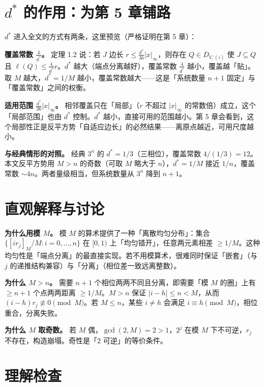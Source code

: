 \documentclass[a4paper,11pt,openany]{ctexbook}
\numberwithin{equation}{chapter}
\numberwithin{figure}{chapter}
\numberwithin{table}{chapter}
\begin{document}
\section{$d^*$ 的作用：为第 5 章铺路}

$d^*$ 进入全文的方式有两条，这里预览（严格证明在第 5 章）：

\textbf{覆盖常数 $\frac4{d^*}$。} 定理 1.2 说：若 $J$ 边长 $r\le\frac{d^*}{36}|x|_\infty$，则存在 $Q\in D_{V,(i)}$ 使 $J\subseteq Q$ 且 $\ell(Q)\le\frac4{d^*}r$。$d^*$ 越大（端点分离越好），覆盖常数 $\frac4{d^*}$ 越小，覆盖越「贴」。取 $M$ 越大，$d^*=1/M$ 越小，覆盖常数越大——这是「系统数量 $n+1$ 固定」与「覆盖常数」之间的权衡。

\textbf{适用范围 $\frac{d^*}{36}|x|_\infty$。} 相邻覆盖只在「局部」（$r$ 不超过 $|x|_\infty$ 的常数倍）成立，这个「局部范围」也由 $d^*$ 控制。$d^*$ 越小，直接可用的范围越小。第 5 章会看到，这个局部性正是反平方势「自适应边长」的必然结果——离原点越近，可用尺度越小。

\textbf{与经典情形的对照。} 经典 $3^n$ 的 $d^*=1/3$（三相位），覆盖常数 $4/(1/3)=12$。本文反平方势用 $M>n$ 的奇数（可取 $M$ 略大于 $n$），$d^*=1/M$ 接近 $1/n$，覆盖常数 $\sim4n$。两者量级相当，但系统数量从 $3^n$ 降到 $n+1$。

\section{直观解释与讨论}

\textbf{为什么用模 $M$。} 模 $M$ 的算术提供了一种「离散均匀分布」：集合 $\{[ir_j]_M/M:i=0,\dots,n\}$ 在 $[0,1)$ 上「均匀错开」，任意两元素相差 $\ge1/M$。这种均匀性是「端点分离」的最直接实现。若不用模算术，很难同时保证「嵌套」（与 $j$ 的递推结构兼容）与「分离」（相位差一致远离整数）。

\textbf{为什么 $M>n$。} 需要 $n+1$ 个相位两两不同且分离，即需要「模 $M$ 的圈」上有 $\ge n+1$ 个点两两距离 $\ge1/M$。$M>n$ 保证 $|i-h|\le n<M$，从而 $(i-h)r_j\not\equiv0\pmod M$。若 $M\le n$，某些 $i\neq h$ 会满足 $i\equiv h\pmod M$，相位重合，分离失败。

\textbf{为什么 $M$ 取奇数。} 若 $M$ 偶，$\gcd(2,M)=2>1$，$2^j$ 在模 $M$ 下不可逆，$r_j$ 不存在，构造崩塌。奇性是「$2$ 可逆」的等价条件。

\section{理解检查}
\end{document}
